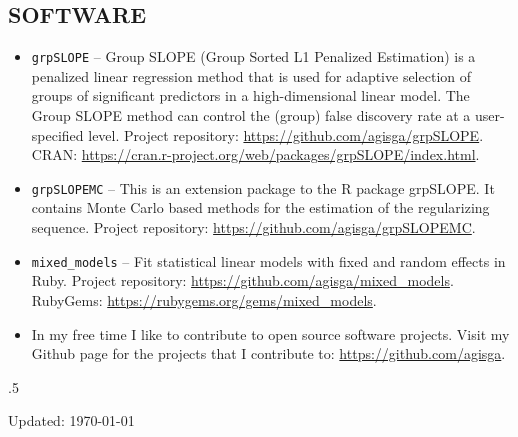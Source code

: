 \documentclass[margin]{res} %
\begin{document}
\begin{resume}
\section{SOFTWARE}

\begin{itemize} \itemsep -2pt %
    \item \verb!grpSLOPE! -- Group SLOPE (Group Sorted L1 Penalized Estimation) is a penalized linear regression method that is used for adaptive selection of groups of significant predictors in a high-dimensional linear model. The Group SLOPE method can control the (group) false discovery rate at a user-specified level. Project repository: \url{https://github.com/agisga/grpSLOPE}. CRAN: \url{https://cran.r-project.org/web/packages/grpSLOPE/index.html}.
    \item \verb!grpSLOPEMC! -- This is an extension package to the R package grpSLOPE. It contains Monte Carlo based methods for the estimation of the regularizing sequence. Project repository: \url{https://github.com/agisga/grpSLOPEMC}.
    \item \verb!mixed_models! -- Fit statistical linear models with fixed and random effects in Ruby. Project repository: \url{https://github.com/agisga/mixed_models}. RubyGems: \url{https://rubygems.org/gems/mixed_models}.
    \item In my free time I like to contribute to open source software projects. Visit my Github page for the projects that I contribute to: \url{https://github.com/agisga}.
\end{itemize}


\vfill
\moveleft.5\hoffset\centerline{Updated: \today}

%
%


\end{resume}
\end{document}
